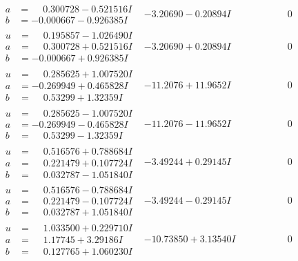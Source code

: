 \documentclass[1p]{elsarticle_modified}
\theoremstyle{definition}
\begin{document}
$$\begin{array}{c|c|c}
\begin{aligned}
a &= \phantom{-}0.300728 - 0.521516 I \\
b &= -0.000667 - 0.926385 I\end{aligned}
 & -3.20690 - 0.20894 I & \phantom{-0.000000 } 0 \\ \hline\begin{aligned}
u &= \phantom{-}0.195857 - 1.026490 I \\
a &= \phantom{-}0.300728 + 0.521516 I \\
b &= -0.000667 + 0.926385 I\end{aligned}
 & -3.20690 + 0.20894 I & \phantom{-0.000000 } 0 \\ \hline\begin{aligned}
u &= \phantom{-}0.285625 + 1.007520 I \\
a &= -0.269949 + 0.465828 I \\
b &= \phantom{-}0.53299 + 1.32359 I\end{aligned}
 & -11.2076 + 11.9652 I & \phantom{-0.000000 } 0 \\ \hline\begin{aligned}
u &= \phantom{-}0.285625 - 1.007520 I \\
a &= -0.269949 - 0.465828 I \\
b &= \phantom{-}0.53299 - 1.32359 I\end{aligned}
 & -11.2076 - 11.9652 I & \phantom{-0.000000 } 0 \\ \hline\begin{aligned}
u &= \phantom{-}0.516576 + 0.788684 I \\
a &= \phantom{-}0.221479 + 0.107724 I \\
b &= \phantom{-}0.032787 - 1.051840 I\end{aligned}
 & -3.49244 + 0.29145 I & \phantom{-0.000000 } 0 \\ \hline\begin{aligned}
u &= \phantom{-}0.516576 - 0.788684 I \\
a &= \phantom{-}0.221479 - 0.107724 I \\
b &= \phantom{-}0.032787 + 1.051840 I\end{aligned}
 & -3.49244 - 0.29145 I & \phantom{-0.000000 } 0 \\ \hline\begin{aligned}
u &= \phantom{-}1.033500 + 0.229710 I \\
a &= \phantom{-}1.17745 + 3.29186 I \\
b &= \phantom{-}0.127765 + 1.060230 I\end{aligned}
 & -10.73850 + 3.13540 I & \phantom{-0.000000 } 0 \\ \hline\begin{aligned}

\end{aligned}
\end{array}$$
\end{document}
